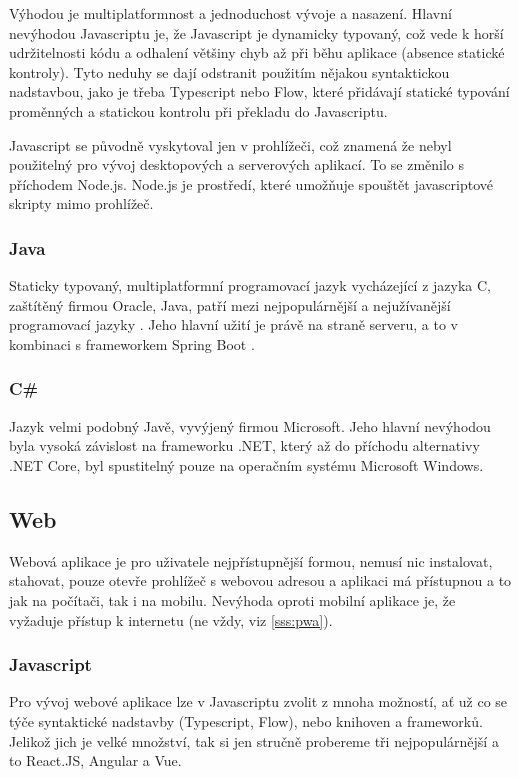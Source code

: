 Výhodou je multiplatformnost a jednoduchost vývoje a nasazení. Hlavní nevýhodou Javascriptu je, že Javascript je dynamicky typovaný, což vede k horší udržitelnosti kódu a odhalení většiny chyb až při běhu aplikace (absence statické kontroly). Tyto neduhy se dají odstranit použitím nějakou syntaktickou nadstavbou, jako je třeba Typescript nebo Flow, které přidávají statické typování proměnných a statickou kontrolu při překladu do Javascriptu.

Javascript se původně vyskytoval jen v prohlížeči, což znamená že nebyl použitelný pro vývoj desktopových a serverových aplikací. To se změnilo s příchodem Node.js. Node.js je prostředí, které umožňuje spouštět javascriptové skripty mimo prohlížeč.

\subsubsection{Java}
Staticky typovaný, multiplatformní programovací jazyk vycházející z jazyka C, zaštítěný firmou Oracle, Java, patří mezi nejpopulárnější a nejužívanější programovací jazyky \cite{stackexchangeinc_2019_stack} . Jeho hlavní užití je právě na straně serveru, a to v kombinaci s frameworkem Spring Boot \cite{jetbrainssro_2019_demographics} .

\subsubsection{C\# }
Jazyk velmi podobný Javě, vyvýjený firmou Microsoft. Jeho hlavní nevýhodou byla vysoká závislost na frameworku .NET, který až do příchodu alternativy .NET Core, byl spustitelný pouze na operačním systému Microsoft Windows.

\subsection{Web}
\label{ss:web}
Webová aplikace je pro uživatele nejpřístupnější formou, nemusí nic instalovat, stahovat, pouze otevře prohlížeč s webovou adresou a aplikaci má přístupnou a to jak na počítači, tak i na mobilu. Nevýhoda oproti mobilní aplikace je, že vyžaduje přístup k internetu (ne vždy, viz \ref{sss:pwa}).

\subsubsection{Javascript}
Pro vývoj webové aplikace lze v Javascriptu zvolit z mnoha možností, ať už co se týče syntaktické nadstavby (Typescript, Flow), nebo knihoven a frameworků. Jelikož jich je velké množství, tak si jen stručně probereme tři nejpopulárnější a to React.JS, Angular a Vue.

